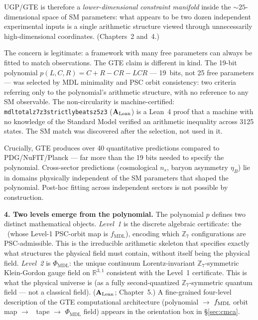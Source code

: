 \documentclass[11pt,openany]{book}
\theoremstyle{remark}
\newcommand{\PHIMDL}{\Phi_{\mathrm{MDL}}}
\newcommand{\lean}[1]{%
  \penalty-100
  \begingroup\def\_{\textunderscore\allowbreak}\texttt{#1}\endgroup}
\newcommand{\CMCA}{\text{CMCA}}
\newcommand{\CatAL}{\ensuremath{\textbf{A}_{\rm Lean}}}
\begin{document}
UGP/GTE is therefore a \emph{lower-dimensional constraint manifold} inside
the $\sim\!25$-dimensional space of SM parameters: what appears to be two
dozen independent experimental inputs is a single arithmetic structure
viewed through unnecessarily high-dimensional coordinates.
(Chapters~2 and~4.)

\begin{tcolorbox}[colback=green!4,colframe=green!55!black,
  title={\textbf{Why This Is Not Numerology}},
  fonttitle=\small\bfseries, left=6pt, right=6pt, top=4pt, bottom=4pt]
\small
The concern is legitimate: a framework with many free parameters can always be fitted to
match observations.
The GTE claim is different in kind.
The 19-bit polynomial $p(L,C,R) = C+R-CR-LCR$ --- 19~bits, not 25 free parameters ---
was selected by MDL minimality and PSC orbit consistency: two criteria referring only to
the polynomial's arithmetic structure, with no reference to any SM observable.
The non-circularity is machine-certified: \lean{mdl\_total\_z7z3\_strictly\_beats\_z5z3}
(\CatAL) is a Lean~4 proof that a machine with no knowledge of the Standard Model
verified an arithmetic inequality across 3125 states.
The SM match was discovered after the selection, not used in it.

\smallskip\noindent
Crucially, GTE produces over 40 quantitative predictions compared to PDG/NuFIT/Planck ---
far more than the 19 bits needed to specify the polynomial.
Cross-sector predictions (cosmological $n_s$, baryon asymmetry $\eta_B$) lie in
domains physically independent of the SM parameters that shaped the polynomial.
Post-hoc fitting across independent sectors is not possible by construction.
\end{tcolorbox}

\medskip

\textbf{4. Two levels emerge from the polynomial.}
The polynomial $p$ defines two distinct mathematical objects.
\emph{Level~1} is the discrete algebraic certificate: the
\CMCA\ (whose Level-1 PSC-orbit map is $f_{\mathrm{MDL}}$), encoding
which $\mathbb{Z}_7$ configurations are PSC-admissible.
This is the irreducible arithmetic skeleton that specifies exactly what
structures the physical field must contain, without itself being the
physical field.
\emph{Level~2} is $\PHIMDL$: the unique continuum Lorentz-invariant
$\mathbb{Z}_7$-symmetric Klein-Gordon gauge field on $\mathbb{R}^{3,1}$
consistent with the Level~1 certificate.
This is what the physical universe is (as a fully second-quantized
$\mathbb{Z}_7$-symmetric quantum field --- not a classical field).
(\CatAL; Chapter~5.)
A fine-grained four-level description of the GTE computational
architecture (polynomial $\to$ $f_{\rm MDL}$ orbit map $\to$ \CMCA\ tape
$\to$ $\PHIMDL$ field) appears in the orientation box in §\ref{sec:cmca}.
\end{document}
